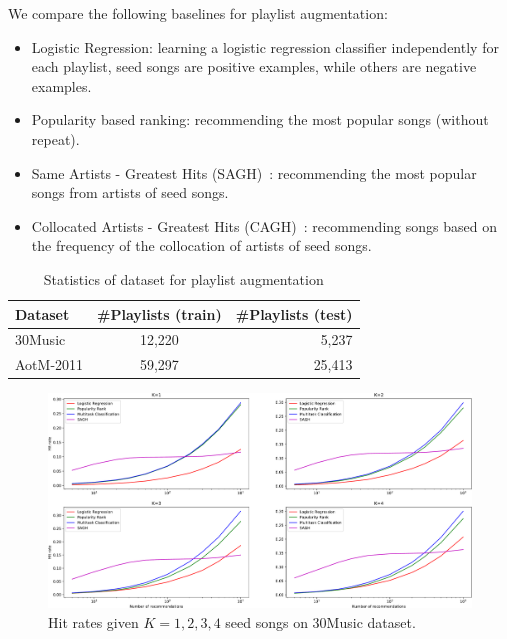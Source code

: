 We compare the following baselines for playlist augmentation:
\begin{itemize}
\item Logistic Regression: learning a logistic regression classifier independently for each playlist,
      seed songs are positive examples, while others are negative examples.
\item Popularity based ranking: recommending the most popular songs (without repeat).
\item Same Artists - Greatest Hits (SAGH)~\cite{mcfee2012million}: 
      recommending the most popular songs from artists of seed songs.
\item Collocated Artists - Greatest Hits (CAGH)~\cite{bonnin2013evaluating}: 
      recommending songs based on the frequency of the collocation of artists of seed songs.
\end{itemize}

\begin{table}[!h]
\centering
\caption{Statistics of dataset for playlist augmentation}
\label{tab:stats_pla}
\small
\begin{tabular}{l|cr}
\toprule
Dataset   & \#Playlists (train) & \#Playlists (test) \\
\midrule
30Music   & 12,220              & 5,237 \\
AotM-2011 & 59,297              & 25,413 \\       
\bottomrule
\end{tabular}
\end{table}



\begin{figure}[!h]
\centering
\includegraphics[width=\linewidth]{fig/30music-2.pdf}
\caption{Hit rates given $K=1,2,3,4$ seed songs on 30Music dataset.}
\end{figure}

